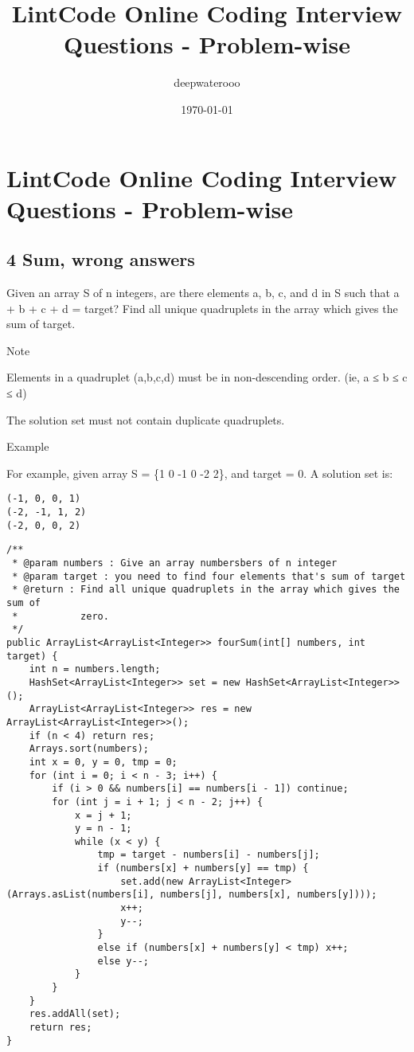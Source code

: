 \documentclass[9pt, b5paaper]{book}
\author{deepwaterooo}
\date{\today}
\title{LintCode Online Coding Interview Questions - Problem-wise}
\begin{document}
\maketitle
\tableofcontents


\chapter{LintCode Online Coding Interview Questions - Problem-wise}
\label{sec-1}
\section{4 Sum, wrong answers}
\label{sec-1-1}

Given an array S of n integers, are there elements a, b, c, and d in S such that a + b + c + d = target? Find all unique quadruplets in the array which gives the sum of target.

Note

Elements in a quadruplet (a,b,c,d) must be in non-descending order. (ie, a ≤ b ≤ c ≤ d)

The solution set must not contain duplicate quadruplets.

Example

For example, given array S = \{1 0 -1 0 -2 2\}, and target = 0. A solution set is:
\begin{verbatim}
(-1, 0, 0, 1)
(-2, -1, 1, 2)
(-2, 0, 0, 2)
\end{verbatim}
\begin{verbatim}
/**
 * @param numbers : Give an array numbersbers of n integer
 * @param target : you need to find four elements that's sum of target
 * @return : Find all unique quadruplets in the array which gives the sum of
 *           zero.
 */
public ArrayList<ArrayList<Integer>> fourSum(int[] numbers, int target) {     
    int n = numbers.length;
    HashSet<ArrayList<Integer>> set = new HashSet<ArrayList<Integer>>();
    ArrayList<ArrayList<Integer>> res = new ArrayList<ArrayList<Integer>>();
    if (n < 4) return res;
    Arrays.sort(numbers);
    int x = 0, y = 0, tmp = 0;
    for (int i = 0; i < n - 3; i++) {
        if (i > 0 && numbers[i] == numbers[i - 1]) continue;
        for (int j = i + 1; j < n - 2; j++) {
            x = j + 1;
            y = n - 1;
            while (x < y) {
                tmp = target - numbers[i] - numbers[j];
                if (numbers[x] + numbers[y] == tmp) {
                    set.add(new ArrayList<Integer>(Arrays.asList(numbers[i], numbers[j], numbers[x], numbers[y])));
                    x++;
                    y--;
                }
                else if (numbers[x] + numbers[y] < tmp) x++;
                else y--;
            }
        }
    }
    res.addAll(set);
    return res;
}
\end{verbatim}
\end{document}
